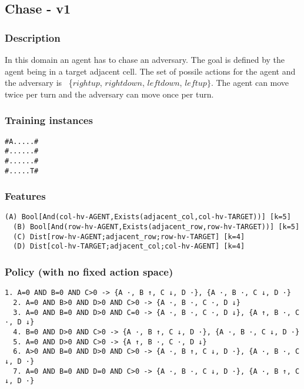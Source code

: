 \documentclass[a4paper]{article}
\begin{document}
\subsection{Chase - v1}
\subsubsection{Description}
In this domain an agent has to chase an adversary. The goal is defined by the agent being in a target adjacent cell. The set of possile actions for the agent and the adversary is ~\{$rightup$, $rightdown$, $leftdown$, $leftup\}$. The agent can move twice per turn and the adversary can move once per turn.

\subsubsection{Training instances}
\begin{Verbatim}[fontsize=\footnotesize]
#A.....#
#......#
#......#
#.....T#
\end{Verbatim}

\subsubsection{Features}
\begin{Verbatim}[fontsize=\footnotesize]
  (A) Bool[And(col-hv-AGENT,Exists(adjacent_col,col-hv-TARGET))] [k=5]
  (B) Bool[And(row-hv-AGENT,Exists(adjacent_row,row-hv-TARGET))] [k=5]
  (C) Dist[row-hv-AGENT;adjacent_row;row-hv-TARGET] [k=4]
  (D) Dist[col-hv-TARGET;adjacent_col;col-hv-AGENT] [k=4]
\end{Verbatim}

\subsubsection{Policy (with no fixed action space)}
\begin{Verbatim}[fontsize=\footnotesize]
  1. A=0 AND B=0 AND C>0 -> {A ·, B ↑, C ↓, D ·}, {A ·, B ·, C ↓, D ·}
  2. A=0 AND B>0 AND D>0 AND C>0 -> {A ·, B ·, C ·, D ↓}
  3. A=0 AND B=0 AND D>0 AND C=0 -> {A ·, B ·, C ·, D ↓}, {A ↑, B ·, C ·, D ↓}
  4. B=0 AND D>0 AND C>0 -> {A ·, B ↑, C ↓, D ·}, {A ·, B ·, C ↓, D ·}
  5. A=0 AND D>0 AND C>0 -> {A ↑, B ·, C ·, D ↓}
  6. A>0 AND B=0 AND D>0 AND C>0 -> {A ·, B ↑, C ↓, D ·}, {A ·, B ·, C ↓, D ·}
  7. A=0 AND B=0 AND D=0 AND C>0 -> {A ·, B ·, C ↓, D ·}, {A ·, B ↑, C ↓, D ·}

\end{Verbatim}
\end{document}
